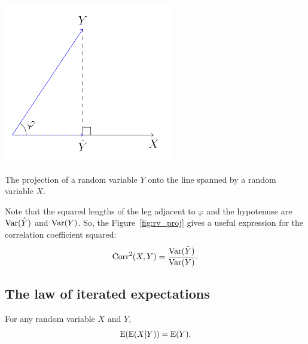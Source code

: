 \begin{marginfigure}
\includegraphics{figures/01_basic_projection.pdf}
\caption{The projection of a random variable $Y$ onto the line spanned by
a random variable $X$.}
\label{fig:rv_proj}
\end{marginfigure}

Note that the squared lengths of the leg adjacent to $\varphi$ and the
hypotenuse are $\operatorname{Var}(\hat Y)$ and $\operatorname{Var}(Y)$.
So, the Figure~\ref{fig:rv_proj} gives a useful expression for the correlation
coefficient squared:
\[
\operatorname{Corr}^2(X,Y) = \frac{\operatorname{Var}(\hat Y)}{\operatorname{Var}(Y)}.
\]

\subsection{The law of iterated expectations}


\begin{theorem}
For any random variable $X$ and $Y$,
\[
\operatorname{E}(\operatorname{E}(X|Y)) = \operatorname{E}(Y).
\]
\end{theorem}

